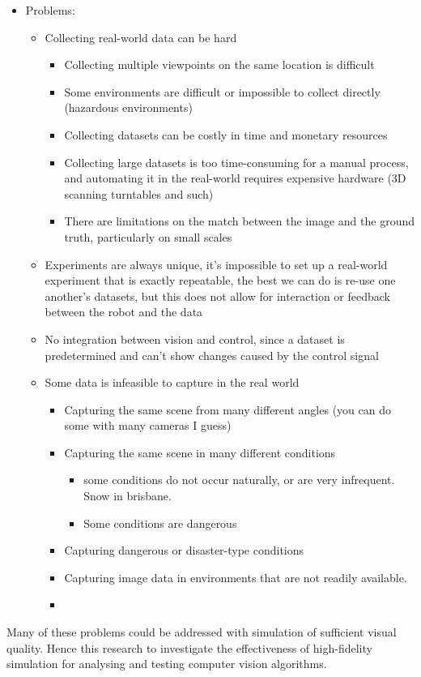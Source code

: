 \begin{itemize}
\item Problems:
	\begin{itemize}
	\item Collecting real-world data can be hard
		\begin{itemize}
		\item Collecting multiple viewpoints on the same location is difficult
		\item Some environments are difficult or impossible to collect directly (hazardous environments)
		\item Collecting datasets can be costly in time and monetary resources
		\item Collecting large datasets is too time-consuming for a manual process, and automating it in the real-world requires expensive hardware (3D scanning turntables and such)
		\item There are limitations on the match between the image and the ground truth, particularly on small scales
		\end{itemize}
	\item Experiments are always unique, it's impossible to set up a real-world experiment that is exactly repeatable, the best we can do is re-use one another's datasets, but this does not allow for interaction or feedback between the robot and the data
	\item No integration between vision and control, since a dataset is predetermined and can't show changes caused by the control signal
	\item Some data is infeasible to capture in the real world
	    \begin{itemize}
        \item Capturing the same scene from many different angles (you can do some with many cameras I guess)
        \item Capturing the same scene in many different conditions
        \begin{itemize}
            \item some conditions do not occur naturally, or are very infrequent. Snow in brisbane.
            \item Some conditions are dangerous 
        \end{itemize}
        \item Capturing dangerous or disaster-type conditions
        \item Capturing image data in environments that are not readily available.
        \item 
	    \end{itemize}
    \end{itemize}
\end{itemize}
Many of these problems could be addressed with simulation of sufficient visual quality. Hence this research to investigate the effectiveness of high-fidelity simulation for analysing and testing computer vision algorithms.

